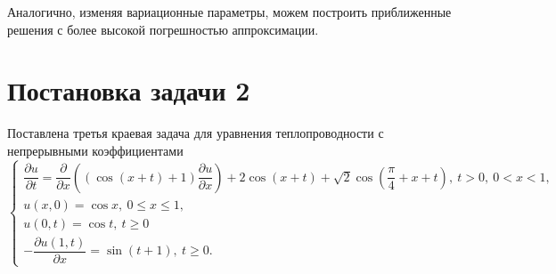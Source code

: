 \documentclass[a4paper, 12pt]{article}
\renewcommand{\d}{\partial}
\begin{document}
    Аналогично, изменяя вариационные параметры, можем построить приближенные
решения с более высокой погрешностью аппроксимации.

\section*{Постановка задачи 2}
Поставлена третья краевая задача для уравнения теплопроводности с непрерывными коэффициентами
\begin{equation}
	\begin{cases}
		\dfrac{\d u}{\d t} = \dfrac{\d }{\d x}\left((\cos(x+t)+1)\dfrac{\d u}{\d x}\right) +2\cos(x+t) +\sqrt 2\cos \left(\dfrac \pi 4  + x + t\right),\ t>0,\ 0 < x < 1,\\
		u(x,0) = \cos x,\ 0 \leq x \leq 1,\\
		u(0,t)=\cos t,\ t\geq 0\\ 
		-\dfrac{\d u(1,t)}{\d x} = \sin(t+1),\ t\geq 0.
	\end{cases}
\end{equation}
\end{document}
